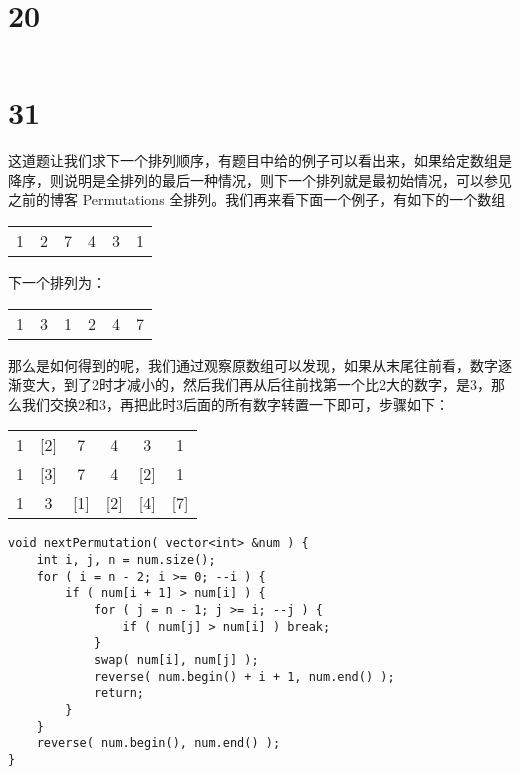 \documentclass[12pt,a4paper]{article}
\begin{document}
\section{20}
\begin{CJK}{UTF8}{gbsn}
\end{CJK}
\begin{lstlisting}
\end{lstlisting}

\section{31}
\begin{CJK}{UTF8}{gbsn}
这道题让我们求下一个排列顺序，有题目中给的例子可以看出来，如果给定数组是降序，则说明是全排列的最后一种情况，则下一个排列就是最初始情况，可以参见之前的博客 Permutations 全排列。我们再来看下面一个例子，有如下的一个数组
\end{CJK}
\begin{center}
\begin{tabular}{*{6}{c}}
1 & 2 & 7 & 4 & 3 & 1\\
\end{tabular}
\end{center}
\begin{CJK}{UTF8}{gbsn}
下一个排列为：
\end{CJK}
\begin{center}
\begin{tabular}{*{6}{c}}
1 & 3 & 1 & 2 & 4 & 7\\
\end{tabular}
\end{center}
\begin{CJK}{UTF8}{gbsn}
那么是如何得到的呢，我们通过观察原数组可以发现，如果从末尾往前看，数字逐渐变大，到了2时才减小的，然后我们再从后往前找第一个比2大的数字，是3，那么我们交换2和3，再把此时3后面的所有数字转置一下即可，步骤如下：
\end{CJK}
\begin{center}
\begin{tabular}{*{6}{c}}
1 & [2] & 7 & 4 & 3 & 1\\
1 & [3] & 7 & 4 & [2] & 1\\
1 & 3 & [1] & [2] & [4] & [7]\\
\end{tabular}
\end{center}
\begin{lstlisting}
void nextPermutation( vector<int> &num ) {
	int i, j, n = num.size();
	for ( i = n - 2; i >= 0; --i ) {
		if ( num[i + 1] > num[i] ) {
			for ( j = n - 1; j >= i; --j ) {
				if ( num[j] > num[i] ) break;
			}
			swap( num[i], num[j] );
			reverse( num.begin() + i + 1, num.end() );
			return;
		}
	}
	reverse( num.begin(), num.end() );
}
\end{lstlisting}
\end{document}
